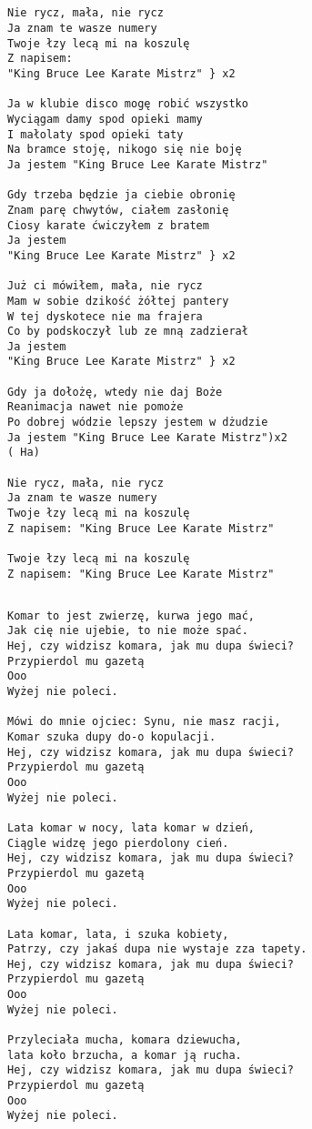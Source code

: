 \documentclass[12pt]{article}
\begin{document}
\subsection*{}
\begin{verbatim}
Nie rycz, mała, nie rycz
Ja znam te wasze numery
Twoje łzy lecą mi na koszulę
Z napisem:
"King Bruce Lee Karate Mistrz" } x2

Ja w klubie disco mogę robić wszystko
Wyciągam damy spod opieki mamy
I małolaty spod opieki taty
Na bramce stoję, nikogo się nie boję
Ja jestem "King Bruce Lee Karate Mistrz"

Gdy trzeba będzie ja ciebie obronię
Znam parę chwytów, ciałem zasłonię
Ciosy karate ćwiczyłem z bratem
Ja jestem
"King Bruce Lee Karate Mistrz" } x2

Już ci mówiłem, mała, nie rycz
Mam w sobie dzikość żółtej pantery
W tej dyskotece nie ma frajera
Co by podskoczył lub ze mną zadzierał
Ja jestem
"King Bruce Lee Karate Mistrz" } x2

Gdy ja dołożę, wtedy nie daj Boże
Reanimacja nawet nie pomoże
Po dobrej wódzie lepszy jestem w dżudzie
Ja jestem "King Bruce Lee Karate Mistrz")x2
( Ha)

Nie rycz, mała, nie rycz
Ja znam te wasze numery
Twoje łzy lecą mi na koszulę
Z napisem: "King Bruce Lee Karate Mistrz"

Twoje łzy lecą mi na koszulę
Z napisem: "King Bruce Lee Karate Mistrz"
\end{verbatim}
\clearpage

\subsection*{}
\begin{verbatim}
Komar to jest zwierzę, kurwa jego mać,
Jak cię nie ujebie, to nie może spać.
Hej, czy widzisz komara, jak mu dupa świeci?
Przypierdol mu gazetą
Ooo
Wyżej nie poleci.

Mówi do mnie ojciec: Synu, nie masz racji,
Komar szuka dupy do-o kopulacji.
Hej, czy widzisz komara, jak mu dupa świeci?
Przypierdol mu gazetą
Ooo
Wyżej nie poleci.

Lata komar w nocy, lata komar w dzień,
Ciągle widzę jego pierdolony cień.
Hej, czy widzisz komara, jak mu dupa świeci?
Przypierdol mu gazetą
Ooo
Wyżej nie poleci.

Lata komar, lata, i szuka kobiety,
Patrzy, czy jakaś dupa nie wystaje zza tapety.
Hej, czy widzisz komara, jak mu dupa świeci?
Przypierdol mu gazetą
Ooo
Wyżej nie poleci.

Przyleciała mucha, komara dziewucha,
lata koło brzucha, a komar ją rucha.
Hej, czy widzisz komara, jak mu dupa świeci?
Przypierdol mu gazetą
Ooo
Wyżej nie poleci.
\end{verbatim}
\clearpage
\end{document}
